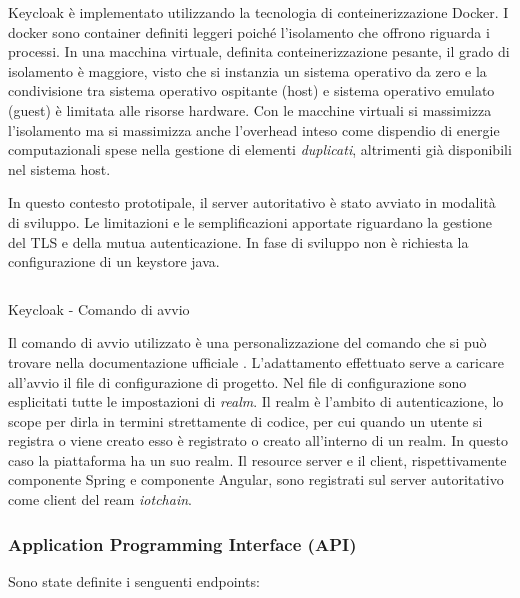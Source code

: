 \documentclass[a4paper,11pt]{article}
\begin{document}
Keycloak è implementato utilizzando la tecnologia di conteinerizzazione Docker. I docker sono container definiti leggeri poiché l'isolamento che offrono riguarda i processi. In una macchina virtuale, definita conteinerizzazione pesante, il grado di isolamento è maggiore, visto che si instanzia un sistema operativo da zero e la condivisione tra sistema operativo ospitante (host) e sistema operativo emulato (guest) è limitata alle risorse hardware. Con le macchine virtuali si massimizza l'isolamento ma si massimizza anche l'overhead inteso come dispendio di energie computazionali spese nella gestione di elementi \textit{duplicati}, altrimenti già disponibili nel sistema host. \cite{dockerWhatContainer}

In questo contesto prototipale, il server autoritativo è stato avviato in modalità di sviluppo. Le limitazioni e le semplificazioni apportate riguardano la gestione del TLS e della mutua autenticazione. In fase di sviluppo non è richiesta la configurazione di un keystore java.

\begin{listing}
  \inputminted{bash}{./code/avvio.kc.sh}
  \caption{Keycloak - Comando di avvio}
  \label{listing:avviokc}
\end{listing}

Il comando di avvio utilizzato è una personalizzazione del comando che si può trovare nella documentazione ufficiale \cite{keycloakDockerKeycloak}. L'adattamento effettuato serve a caricare all'avvio il file di configurazione di progetto. Nel file di configurazione sono esplicitati tutte le impostazioni di \textit{realm}. Il realm è l'ambito di autenticazione, lo scope per dirla in termini strettamente di codice, per cui quando un utente si registra o viene creato esso è registrato o creato all'interno di un realm. In questo caso la piattaforma ha un suo realm. Il resource server e il client, rispettivamente componente Spring e componente Angular, sono registrati sul server autoritativo come client del ream \textit{iotchain}.

\subsubsection{Application Programming Interface (API)}

Sono state definite i senguenti endpoints:
\end{document}
